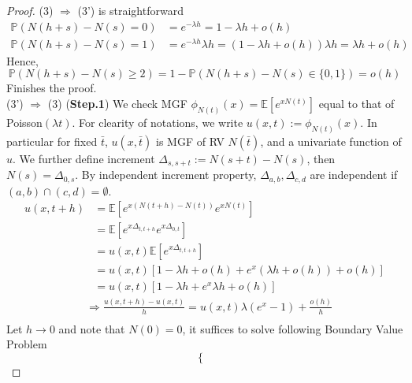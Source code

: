 \documentclass[a4paper, 10pt]{article}
\theoremstyle{definition}
\theoremstyle{hSol}
\begin{document}
\begin{proof} (3) $\Rightarrow$ (3') is straightforward
\begin{equation}
  \begin{split}
    \mathbb{P}\left(N(h+s)-N(s)=0\right) &= e^{-\lambda h} = 1- \lambda h + o(h) \\
    \mathbb{P}\left(N(h+s)-N(s)=1\right) &= e^{-\lambda h} \lambda h = (1- \lambda h + o(h)) \lambda h = \lambda h + o(h)
  \end{split}
\end{equation}
Hence,
\begin{equation}
  \mathbb{P}\left(N(h+s)-N(s)\geq 2\right) = 1 - \mathbb{P}\left(N(h+s)-N(s)\in \{0,1\}\right)=o(h)
\end{equation}
Finishes the proof. \\
(3') $\Rightarrow$ (3)
(\textbf{Step.1}) We check MGF $\phi_{N(t)}(x)=\mathbb{E}\left[e^{xN(t)}\right]$ equal to that of Poisson$(\lambda t)$. For clearity of notations, we write $u(x,t):=\phi_{N(t)}(x)$. In particular for fixed $\bar{t}$, $u(x,\bar{t})$ is MGF of RV $N(\bar{t})$, and a univariate function of $u$. We further define increment $\Delta_{s,s+t}:=N(s+t)-N(s)$, then $N(s)=\Delta_{0,s}$. By independent increment property, $\Delta_{a,b}, \Delta_{c,d}$ are independent if $(a,b)\cap (c,d)=\emptyset$.
\begin{equation}
  \begin{split}
    u(x,t+h) &= \mathbb{E}\left[e^{x(N(t+h)-N(t))}e^{xN(t)}\right] \\
    &= \mathbb{E}\left[e^{x\Delta_{t,t+h}}e^{x\Delta_{0,t}}\right] \\
    &= u(x,t) \mathbb{E}\left[e^{x\Delta_{t,t+h}}\right] \\
    &= u(x,t)\left[1- \lambda h + o(h) + e^x(\lambda h + o(h))+o(h)\right]\\
    &= u(x,t)\left[1- \lambda h  + e^x\lambda h +o(h)\right]
  \end{split}
\end{equation}
\begin{equation}
  \begin{split}
    & \Rightarrow \frac{u(x,t+h)-u(x,t)}{h} = u(x,t)\lambda (e^x-1) + \frac{o(h)}{h} \\
  \end{split}
\end{equation}
Let $h\to 0$ and note that $N(0)=0$, it suffices to solve following Boundary Value Problem
\begin{equation}
  \begin{cases}

\end{cases}
\end{equation}
\end{proof}
\end{document}
